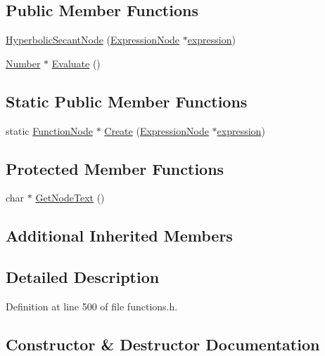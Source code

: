 \subsection*{Public Member Functions}
\begin{DoxyCompactItemize}
\item 
\hyperlink{classHyperbolicSecantNode_a37e6e8b05d445531db7481549b921bef}{Hyperbolic\+Secant\+Node} (\hyperlink{classExpressionNode}{Expression\+Node} $\ast$\hyperlink{classFunctionNode_ad7577b179a1937aaf8a0058bb5b546dc}{expression})
\item 
\hyperlink{structNumber}{Number} $\ast$ \hyperlink{classHyperbolicSecantNode_a1ffab630945e5272ba6da8f91f6b22ce}{Evaluate} ()
\end{DoxyCompactItemize}
\subsection*{Static Public Member Functions}
\begin{DoxyCompactItemize}
\item 
static \hyperlink{classFunctionNode}{Function\+Node} $\ast$ \hyperlink{classHyperbolicSecantNode_a90694b7427bd82908e6bea1624f43fe1}{Create} (\hyperlink{classExpressionNode}{Expression\+Node} $\ast$\hyperlink{classFunctionNode_ad7577b179a1937aaf8a0058bb5b546dc}{expression})
\end{DoxyCompactItemize}
\subsection*{Protected Member Functions}
\begin{DoxyCompactItemize}
\item 
char $\ast$ \hyperlink{classHyperbolicSecantNode_a10e7b484494dfb038f60516388179eb9}{Get\+Node\+Text} ()
\end{DoxyCompactItemize}
\subsection*{Additional Inherited Members}


\subsection{Detailed Description}


Definition at line 500 of file functions.\+h.



\subsection{Constructor \& Destructor Documentation}
